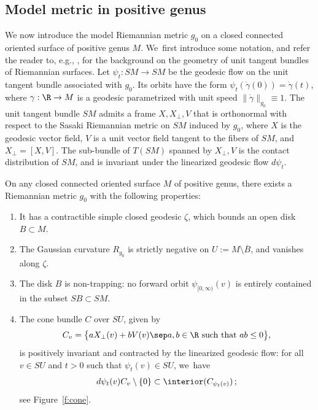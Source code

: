 \subsection{Model metric in positive genus}
We now introduce the model Riemannian metric $g_0$ on a closed connected oriented surface of positive genus $M$. We~first introduce some notation, and refer the reader to, e.g., \cite[\S1.11]{Guillarmou:2024aa}, for the background on the geometry of unit tangent bundles of Riemannian surfaces.
Let $\psi_t:SM\to SM$ be the geodesic flow on the unit tangent bundle associated with $g_0$. Its orbits have the form $\psi_t(\dot\gamma(0))=\dot\gamma(t)$, where $\gamma:\R\to M$ is a geodesic parametrized with unit speed $\|\dot\gamma\|_{g_0}\equiv1$. The unit tangent bundle $SM$ admits a frame $X,X_\perp,V$ that is orthonormal with respect to the Sasaki Riemannian metric on $SM$ induced by $g_0$, where $X$ is the geodesic vector field, $V$ is a unit vector field tangent to the fibers of $SM$, and $X_\perp=[X,V]$. The sub-bundle of $T(SM)$ spanned by $X_\perp,V$ is the contact distribution of $SM$, and is invariant under the linearized geodesic flow $d\psi_t$.

\begin{Prop}
\label{p:model_metric_positive_genus}
On any closed connected oriented surface $M$ of positive genus, there exists a Riemannian metric $g_0$ with the following properties:
\begin{enumerate}
\item\label{p:model_metric_positive_genusi}
It has a contractible simple closed geodesic $\zeta$, which bounds an open disk $B\subset M$.

\item\label{p:model_metric_positive_genusii}
The Gaussian curvature $R_{g_0}$ is strictly negative on $U:=M\setminus\overline B$, and vanishes along $\zeta$.

\item\label{p:model_metric_positive_genusiii}
The disk $B$ is non-trapping: no forward orbit $\psi_{[0,\infty)}(v)$ is entirely contained in the subset $SB\subset SM$.

\item\label{p:model_metric_positive_genusiv}
The cone bundle $C$ over $SU$, given by
\begin{align}
\label{e:cone_field}
C_v
=
\big\{
aX_\perp(v) + b V(v)\sep
a,b\in\R\mbox{ such that }ab\leq0
\big\},
\end{align}
is positively invariant and contracted by the linearized geodesic flow: for all $v\in SU$ and $t>0$ such that $\psi_t(v)\in SU$, we~have
\begin{align*}
d\psi_t(v)C_v\setminus\{0\}\subset \interior(C_{\psi_t(v)})\,;
\end{align*}
see Figure~\ref{f:cone}.
\end{enumerate}
\end{Prop}

